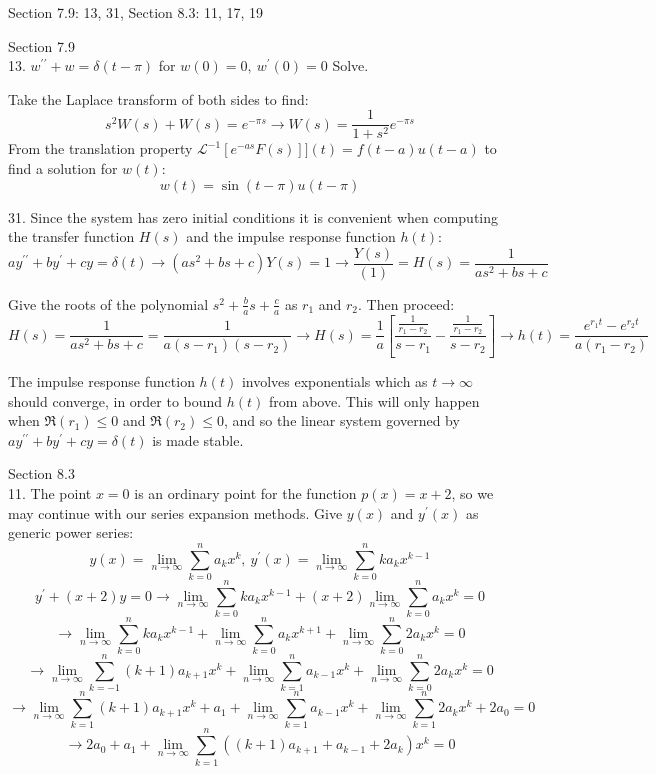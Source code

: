 \documentclass[11pt]{article}
\newcommand{\br}[1]{\left(#1\right)}
\newcommand{\sbr}[1]{\left[#1\right]}
\newcommand{\dprime}{\prime\prime}
\begin{document}
Section 7.9: 13, 31, Section 8.3: 11, 17, 19

Section 7.9\\

13. $w^{\dprime}+w = \delta(t-\pi)$ for $w(0) = 0,~ w^{\prime}(0) = 0$ Solve.

Take the Laplace transform of both sides to find:
$$s^2W(s)+W(s) = e^{-\pi s} \to W(s) = \frac{1}{1+s^2}e^{-\pi s}$$
From the translation property $\mathcal{L}^{-1}[e^{-as}F(s)]](t) = f(t-a)u(t-a)$ to find a solution for $w(t)$:
$$w(t) = \sin(t-\pi)u(t-\pi)$$

31. Since the system has zero initial conditions it is convenient when computing the transfer function $H(s)$ and the impulse response function $h(t)$:
$$ay^{\dprime}+by^{\prime}+cy = \delta(t) \to \br{as^2+bs+c}Y(s) = 1 \to \frac{Y(s)}{(1)} = H(s) = \frac{1}{as^2+bs+c}$$

Give the roots of the polynomial $s^2+\frac{b}{a}s+\frac{c}{a}$ as $r_1$ and $r_2$. Then proceed:
$$H(s) = \frac{1}{as^2+bs+c} = \frac{1}{a(s-r_1)(s-r_2)} \to H(s) = \frac{1}{a}\sbr{\frac{\frac{1}{r_1-r_2}}{s-r_1} - \frac{\frac{1}{r_1-r_2}}{s-r_2}} \to h(t) = \frac{e^{r_1 t}-e^{r_2 t}}{a\br{r_1-r_2}}$$

The impulse response function $h(t)$ involves exponentials which as $t\to \infty$ should converge, in order to bound $h(t)$ from above. This will only happen when $\Re(r_1) \leq 0$ and $\Re(r_2) \leq 0$, and so the linear system governed by $ay^{\dprime}+by^{\prime}+cy = \delta(t)$ is made stable.

Section 8.3\\

11. The point $x=0$ is an ordinary point for the function $p(x) = x+2$, so we may continue with our series expansion methods. Give $y(x)$ and $y^{\prime}(x)$ as generic power series:
$$y(x) = \lim_{n\to \infty}\sum_{k=0}^{n} a_k x^k, ~ y^{\prime}(x) = \lim_{n\to \infty}\sum_{k=0}^n ka_kx^{k-1}$$
$$y^{\prime} + (x+2)y = 0 \to \lim_{n\to \infty}\sum_{k=0}^n ka_kx^{k-1} + (x+2)\lim_{n\to \infty}\sum_{k=0}^{n} a_k x^k = 0$$
$$\to \lim_{n\to \infty}\sum_{k=0}^n ka_kx^{k-1} + \lim_{n\to \infty}\sum_{k=0}^{n} a_k x^{k+1} + \lim_{n\to \infty}\sum_{k=0}^{n} 2a_k x^k = 0$$
$$\to \lim_{n\to \infty}\sum_{k=-1}^n \br{k+1}a_{k+1}x^{k} + \lim_{n\to \infty}\sum_{k=1}^{n} a_{k-1} x^{k} + \lim_{n\to \infty}\sum_{k=0}^{n} 2a_k x^k = 0$$
$$\to \lim_{n\to \infty}\sum_{k=1}^n \br{k+1}a_{k+1}x^{k} + a_1 + \lim_{n\to \infty}\sum_{k=1}^{n} a_{k-1} x^{k} + \lim_{n\to \infty}\sum_{k=1}^{n} 2a_k x^k + 2a_0 = 0$$
$$\to 2a_0 + a_1 + \lim_{n\to \infty}\sum_{k=1}^n\br{ \br{k+1}a_{k+1} + a_{k-1} + 2a_k}x^k = 0$$
\end{document}
